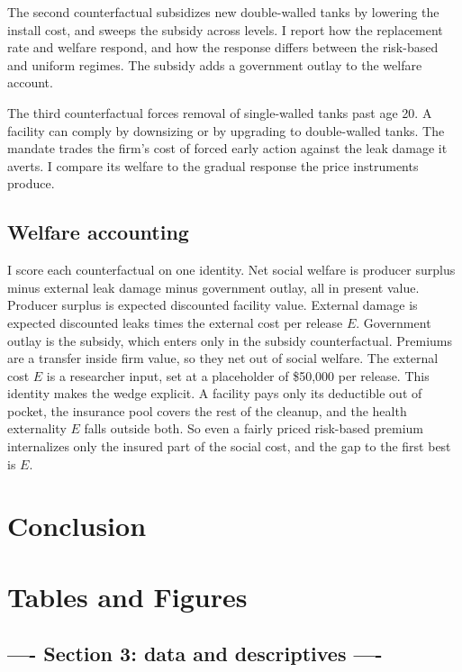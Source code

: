 \documentclass[
  12pt,
]{article}
\begin{document}
The second counterfactual subsidizes new double-walled tanks by lowering
the install cost, and sweeps the subsidy across levels. I report how the
replacement rate and welfare respond, and how the response differs
between the risk-based and uniform regimes. The subsidy adds a
government outlay to the welfare account.

The third counterfactual forces removal of single-walled tanks past age
20. A facility can comply by downsizing or by upgrading to double-walled
tanks. The mandate trades the firm's cost of forced early action against
the leak damage it averts. I compare its welfare to the gradual response
the price instruments produce.

\subsection{Welfare accounting}\label{welfare-accounting}

I score each counterfactual on one identity. Net social welfare is
producer surplus minus external leak damage minus government outlay, all
in present value. Producer surplus is expected discounted facility
value. External damage is expected discounted leaks times the external
cost per release \(E\). Government outlay is the subsidy, which enters
only in the subsidy counterfactual. Premiums are a transfer inside firm
value, so they net out of social welfare. The external cost \(E\) is a
researcher input, set at a placeholder of \$50,000 per release. This
identity makes the wedge explicit. A facility pays only its deductible
out of pocket, the insurance pool covers the rest of the cleanup, and
the health externality \(E\) falls outside both. So even a fairly priced
risk-based premium internalizes only the insured part of the social
cost, and the gap to the first best is \(E\).

\section{Conclusion}\label{conclusion}

\section*{Tables and Figures}\label{tables-and-figures}

\subsection{---- Section 3: data and descriptives
----}\label{section-3-data-and-descriptives--}
\end{document}
